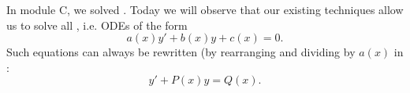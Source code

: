 \begin{applicationActivities}

\begin{observation}
In module C, we solved .
\vfill
Today we will observe that our existing techniques allow us to solve all , i.e. ODEs of the form
\[a(x)y'+b(x)y+c(x)=0.\]
Such equations can always be rewritten (by rearranging and dividing by \(a(x)\) in :
\[y'+P(x)y=Q(x).\]
\end{observation}

\begin{activity}{10}
\end{activity}

\end{applicationActivities}
